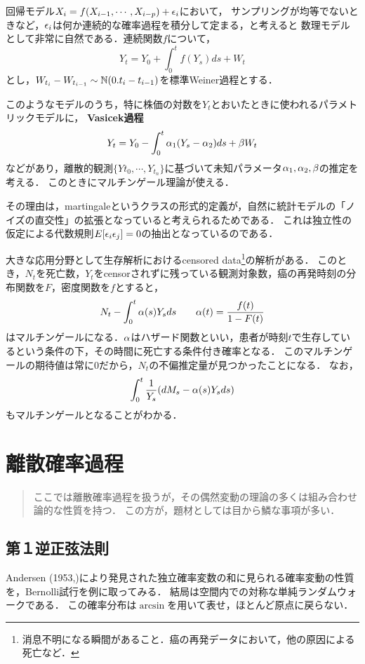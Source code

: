 \documentclass[uplatex,dvipdfmx]{jsreport}
\begin{document}
回帰モデル$X_i=f(X_{i-1},\cdots,X_{i-p})+\epsilon_i$において，
サンプリングが均等でないときなど，$\epsilon_i$は何か連続的な確率過程を積分して定まる，と考えると
数理モデルとして非常に自然である．連続関数$f$について，
\[Y_t=Y_0+\int^t_0f(Y_s)ds+W_t\]
とし，$W_{t_i}-W_{t_{i-1}}\sim\mathbb{N}(0.t_i-t_{i-1})$を標準Weiner過程とする．

このようなモデルのうち，特に株価の対数を$Y_t$とおいたときに使われるパラメトリックモデルに，
\textbf{Vasicek過程}
\[Y_t=Y_0-\int^t_0\alpha_1(Y_s-\alpha_2)ds+\beta W_t\]
などがあり，離散的観測$\{Y{t_0},\cdots,Y_{t_n}\}$に基づいて未知パラメータ$\alpha_1,\alpha_2,\beta$の推定を考える．
このときにマルチンゲール理論が使える．

その理由は，martingaleというクラスの形式的定義が，自然に統計モデルの「ノイズの直交性」の拡張となっていると考えられるためである．
これは独立性の仮定による代数規則$E[\epsilon_i\epsilon_j]=0$の抽出となっているのである．

大きな応用分野として生存解析におけるcensored data\footnote{消息不明になる瞬間があること．癌の再発データにおいて，他の原因による死亡など．}の解析がある．
このとき，$N_t$を死亡数，$Y_t$をcensorされずに残っている観測対象数，癌の再発時刻の分布関数を$F$，密度関数を$f$とすると，
\[N_t-\int^t_0\alpha(s)Y_sds\qquad\alpha(t)=\frac{f(t)}{1-F(t)}\]
はマルチンゲールになる．$\alpha$はハザード関数といい，患者が時刻$t$で生存しているという条件の下，その時間に死亡する条件付き確率となる．
このマルチンゲールの期待値は常に$0$だから，$N_t$の不偏推定量が見つかったことになる．
なお，
\[\int^t_0\frac{1}{Y_s}(dM_s-\alpha(s)Y_sds)\]
もマルチンゲールとなることがわかる．

\chapter{離散確率過程}

\begin{quotation}
    ここでは離散確率過程を扱うが，その偶然変動の理論の多くは組み合わせ論的な性質を持つ．
    この方が，題材としては目から鱗な事項が多い．
\end{quotation}

\section{第１逆正弦法則}

\begin{tcolorbox}[colframe=ForestGreen, colback=ForestGreen!10!white,breakable,colbacktitle=ForestGreen!40!white,coltitle=black,fonttitle=\bfseries\sffamily,
title=]
    Andersen (1953,\cite{Andersen})により発見された独立確率変数の和に見られる確率変動の性質を，Bernolli試行を例に取ってみる．
    結局は空間内での対称な単純ランダムウォークである．
    この確率分布は$\arcsin$を用いて表せ，ほとんど原点に戻らない．
\end{tcolorbox}
\end{document}
